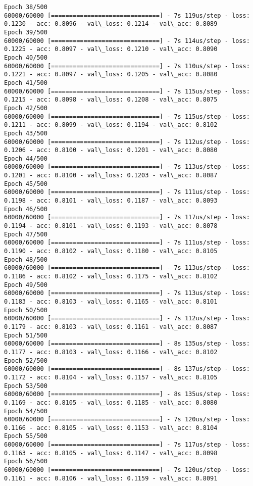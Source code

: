 \documentclass[11pt]{article}
\begin{document}
\begin{Verbatim}[commandchars=\\\{\}]
Epoch 38/500
60000/60000 [==============================] - 7s 119us/step - loss: 0.1230 - acc: 0.8096 - val\_loss: 0.1214 - val\_acc: 0.8089
Epoch 39/500
60000/60000 [==============================] - 7s 114us/step - loss: 0.1225 - acc: 0.8097 - val\_loss: 0.1210 - val\_acc: 0.8090
Epoch 40/500
60000/60000 [==============================] - 7s 110us/step - loss: 0.1221 - acc: 0.8097 - val\_loss: 0.1205 - val\_acc: 0.8080
Epoch 41/500
60000/60000 [==============================] - 7s 115us/step - loss: 0.1215 - acc: 0.8098 - val\_loss: 0.1208 - val\_acc: 0.8075
Epoch 42/500
60000/60000 [==============================] - 7s 115us/step - loss: 0.1211 - acc: 0.8099 - val\_loss: 0.1194 - val\_acc: 0.8102
Epoch 43/500
60000/60000 [==============================] - 7s 112us/step - loss: 0.1206 - acc: 0.8100 - val\_loss: 0.1201 - val\_acc: 0.8080
Epoch 44/500
60000/60000 [==============================] - 7s 113us/step - loss: 0.1201 - acc: 0.8100 - val\_loss: 0.1203 - val\_acc: 0.8087
Epoch 45/500
60000/60000 [==============================] - 7s 111us/step - loss: 0.1198 - acc: 0.8101 - val\_loss: 0.1187 - val\_acc: 0.8093
Epoch 46/500
60000/60000 [==============================] - 7s 117us/step - loss: 0.1194 - acc: 0.8101 - val\_loss: 0.1193 - val\_acc: 0.8078
Epoch 47/500
60000/60000 [==============================] - 7s 111us/step - loss: 0.1190 - acc: 0.8102 - val\_loss: 0.1180 - val\_acc: 0.8105
Epoch 48/500
60000/60000 [==============================] - 7s 113us/step - loss: 0.1186 - acc: 0.8102 - val\_loss: 0.1175 - val\_acc: 0.8102
Epoch 49/500
60000/60000 [==============================] - 7s 113us/step - loss: 0.1183 - acc: 0.8103 - val\_loss: 0.1165 - val\_acc: 0.8101
Epoch 50/500
60000/60000 [==============================] - 7s 112us/step - loss: 0.1179 - acc: 0.8103 - val\_loss: 0.1161 - val\_acc: 0.8087
Epoch 51/500
60000/60000 [==============================] - 8s 135us/step - loss: 0.1177 - acc: 0.8103 - val\_loss: 0.1166 - val\_acc: 0.8102
Epoch 52/500
60000/60000 [==============================] - 8s 137us/step - loss: 0.1172 - acc: 0.8104 - val\_loss: 0.1157 - val\_acc: 0.8105
Epoch 53/500
60000/60000 [==============================] - 8s 135us/step - loss: 0.1169 - acc: 0.8105 - val\_loss: 0.1185 - val\_acc: 0.8080
Epoch 54/500
60000/60000 [==============================] - 7s 120us/step - loss: 0.1166 - acc: 0.8105 - val\_loss: 0.1153 - val\_acc: 0.8104
Epoch 55/500
60000/60000 [==============================] - 7s 117us/step - loss: 0.1163 - acc: 0.8105 - val\_loss: 0.1147 - val\_acc: 0.8098
Epoch 56/500
60000/60000 [==============================] - 7s 120us/step - loss: 0.1161 - acc: 0.8106 - val\_loss: 0.1159 - val\_acc: 0.8091

\end{Verbatim}
\end{document}
